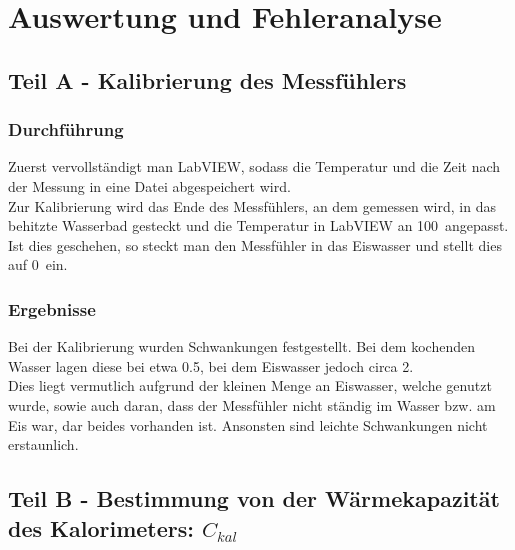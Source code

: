 \documentclass[11pt,a4paper]{article}
\begin{document}
\section{Auswertung und Fehleranalyse}

\subsection{Teil A - Kalibrierung des Messf\"uhlers}

\subsubsection{Durchf\"uhrung}
Zuerst vervollst\"andigt man LabVIEW, sodass die Temperatur und die Zeit nach der Messung in eine Datei abgespeichert wird.\\
Zur Kalibrierung wird das Ende des Messf\"uhlers, an dem gemessen wird, in das behitzte Wasserbad gesteckt und die Temperatur in LabVIEW an 100\celsius\ angepasst. Ist dies geschehen, so steckt man den Messf\"uhler in das Eiswasser und stellt dies auf 0\celsius\ ein.
\pagebreak
\subsubsection{Ergebnisse}
Bei der Kalibrierung wurden Schwankungen festgestellt. Bei dem kochenden Wasser lagen diese bei etwa 0.5\celsius, bei dem Eiswasser jedoch circa 2\celsius.\\
Dies liegt vermutlich aufgrund der kleinen Menge an Eiswasser, welche genutzt wurde, sowie auch daran, dass der Messf\"uhler nicht st\"andig im Wasser bzw. am Eis war, dar beides vorhanden ist. Ansonsten sind leichte Schwankungen nicht erstaunlich.

%

\subsection{Teil B - Bestimmung von der Wärmekapazität des Kalorimeters: $C_{kal}$}
\end{document}
